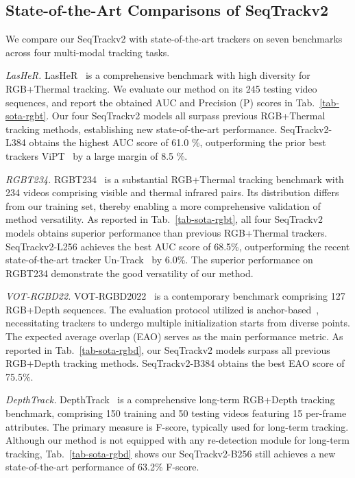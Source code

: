 \subsection{State-of-the-Art Comparisons of SeqTrackv2}

We compare our SeqTrackv2 with state-of-the-art trackers on seven benchmarks across four multi-modal tracking tasks.

\textit{LasHeR.} 
LasHeR~\cite{lasher} is a comprehensive benchmark with high diversity for RGB+Thermal tracking. We evaluate our method on its 245 testing video sequences, and report the obtained AUC and Precision (P) scores in Tab.~\ref{tab-sota-rgbt}. Our four SeqTrackv2 models all surpass previous RGB+Thermal tracking methods, establishing new state-of-the-art performance. SeqTrackv2-L384 obtains the highest AUC score of 61.0 \%, outperforming the prior best trackers ViPT~\cite{vipt} by a large margin of 8.5 \%.

\textit{RGBT234.}
RGBT234~\cite{rgbt234} is a substantial RGB+Thermal tracking benchmark with 234 videos comprising visible and thermal infrared pairs. Its distribution differs from our training set, thereby enabling a more comprehensive validation of method versatility. As reported in Tab.~\ref{tab-sota-rgbt}, all four SeqTrackv2 models obtains superior performance than previous RGB+Thermal trackers. SeqTrackv2-L256 achieves the best AUC score of 68.5\%, outperforming the recent state-of-the-art tracker Un-Track~\cite{untrack} by 6.0\%. The superior performance on RGBT234 demonstrate the good versatility of our method.

\textit{VOT-RGBD22.}
VOT-RGBD2022~\cite{vot2022} is a contemporary benchmark comprising 127 RGB+Depth sequences. The evaluation protocol utilized is anchor-based~\cite{vot2020}, necessitating trackers to undergo multiple initialization starts from diverse points. The expected average overlap (EAO) serves as the main performance metric. As reported in Tab.~\ref{tab-sota-rgbd}, our  SeqTrackv2 models surpass all previous RGB+Depth tracking methods. SeqTrackv2-B384 obtains the best EAO score of 75.5\%.

\textit{DepthTrack.}
DepthTrack~\cite{depthtrack} is a comprehensive long-term RGB+Depth tracking benchmark, comprising 150 training and 50 testing videos featuring 15 per-frame attributes. The primary measure is F-score, typically used for long-term tracking. Although our method is not equipped with any re-detection module for long-term tracking, Tab.~\ref{tab-sota-rgbd} shows our SeqTrackv2-B256 still achieves a new state-of-the-art performance of 63.2\% F-score.

